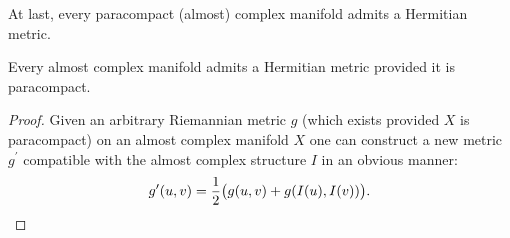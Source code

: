 \documentclass{ctexart}
\begin{document}


At last, every paracompact (almost) complex manifold admits a Hermitian metric. 
\begin{proposition}
  Every almost complex manifold admits a Hermitian metric provided it is paracompact.
\end{proposition}
\begin{proof}[Proof]
  Given an arbitrary Riemannian metric $g$ (which exists provided $X$ is paracompact) on an almost complex manifold $X$ one can construct a new metric $g^\prime$ 
  compatible with the almost complex structure $I$ in an obvious manner:
  $$
  g^\prime(u,v)={1 \over 2}\big(g(u,v)+g(I(u),I(v))\big).
  $$
\end{proof}
\end{document}
